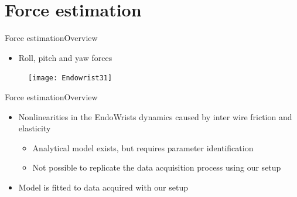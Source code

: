 \section{Force estimation}

\begin{frame}{Force estimation}{Overview}
\begin{itemize}
  	\item Roll, pitch and yaw forces
\end{itemize}
 \begin{figure}[h]
 \centering
 \texttt{[image: Endowrist31]}
 \label{fig:ewr}
 \end{figure}
\end{frame}

\begin{frame}{Force estimation}{Overview}
\begin{itemize}
\item Nonlinearities in the EndoWrists dynamics caused by inter wire friction and elasticity
\begin{itemize}
\item Analytical model exists, but requires parameter identification
\item Not possible to replicate the data acquisition process using our setup
\end{itemize}
\item Model is fitted to data acquired with our setup
\end{itemize}
\end{frame}

